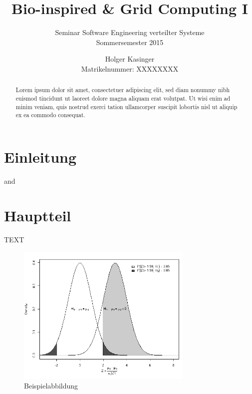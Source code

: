 \documentclass[deutsch,oribibl,a4paper]{llncs}
\begin{document}
\title{Bio-inspired \& Grid Computing I}
\subtitle{Seminar Software Engineering verteilter Systeme\\ Sommersemester 2015}

\author{Holger Kasinger\\ Matrikelnummer: XXXXXXXX \\ }



\maketitle

\begin{abstract}
	Lorem ipsum dolor sit amet, consectetuer adipiscing elit, sed diam nonummy nibh euismod tincidunt ut laoreet dolore magna aliquam erat volutpat. Ut wisi enim ad minim veniam, quis nostrud exerci tation ullamcorper suscipit lobortis nisl ut aliquip ex ea commodo consequat.
\end{abstract}


\newpage

\section{Einleitung}
\label{sec:Einleitung}
\cite{Konak2006,Sailer2013} and \cite{01_MW-Paper}


\section{Hauptteil}
\label{sec:Hauptteil}

TEXT

\begin{figure}[htb]
	\centering
		\includegraphics[width=0.75\textwidth]{power.png}
	\caption{Beispielabbildung}
	\label{fig:power}{}		
\end{figure}
\end{document}
